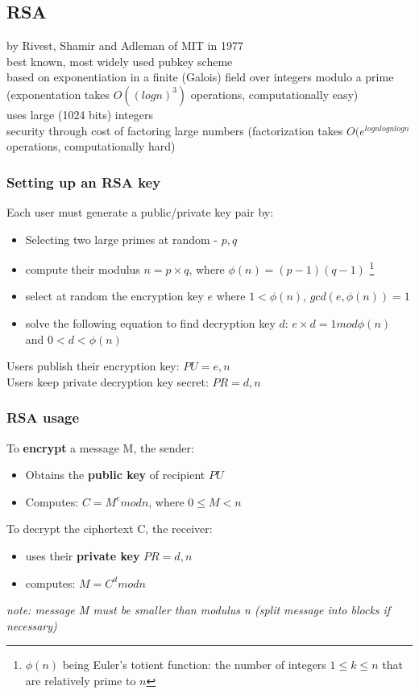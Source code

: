 \documentclass{article}
\begin{document}
\subsection{RSA}
by Rivest, Shamir and Adleman of MIT in 1977
\\best known, most widely used pubkey scheme
\\based on exponentiation in a finite (Galois) field over integers modulo a prime (exponentation takes $O((log n)^3)$ operations, computationally easy)
\\uses large (1024 bits) integers
\\security through cost of factoring large numbers (factorization takes $O(e^{log n log n log n}$ operations, computationally hard)
\subsubsection{Setting up an RSA key}
Each user must generate a public/private key pair by:
\begin{itemize}
    \item Selecting two large primes at random - $p, q$
    \item compute their modulus $n=p\times q$, where $\phi(n)=(p-1)(q-1)$ \footnote{$\phi(n)$ being Euler's totient function: the number of integers $1 \leq k \leq n$ that are relatively prime to $n$}
    \item select at random the encryption key $e$ where $1 < \phi(n)$, $gcd(e,\phi(n)) = 1$
    \item solve the following equation to find decryption key $d$: $e \times d = 1 mod \phi(n)$ and $0<d<\phi(n)$
\end{itemize}
Users publish their encryption key: $PU ={e,n}$
\\Users keep private decryption key secret: $PR={d,n}$
\subsubsection{RSA usage}
To \textbf{encrypt} a message M, the sender:
\begin{itemize}
    \item Obtains the \textbf{public key} of recipient $PU$
    \item Computes: $C=M^e mod n$, where $0\leq M < n$
\end{itemize}
To decrypt the ciphertext C, the receiver:
\begin{itemize}
    \item uses their \textbf{private key} $PR={d,n}$
    \item computes: $M = C^d mod n$
\end{itemize}
\textit{note: message M must be smaller than modulus n (split message into blocks if necessary)}
\end{document}
